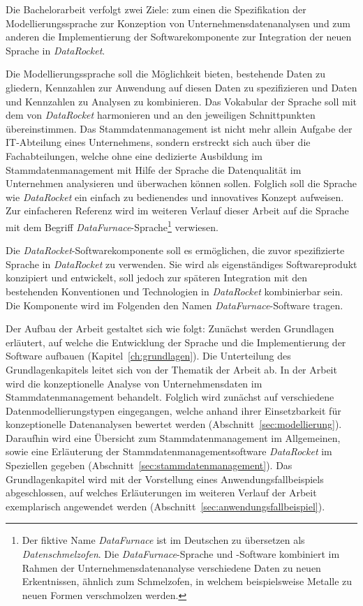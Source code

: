 \documentclass[
  language=german, %
  type=bachelor,%
  ngerman
]{isthesis}
\begin{document}
\begin{content}
  Die Bachelorarbeit verfolgt zwei Ziele: zum einen die Spezifikation der
  Modellierungssprache zur Konzeption von Unternehmensdatenanalysen und zum
  anderen die Implementierung der Softwarekomponente zur Integration der neuen
  Sprache in \textit{DataRocket}.

  Die Modellierungssprache soll die Möglichkeit bieten, bestehende Daten zu
  gliedern, Kennzahlen zur Anwendung auf diesen Daten zu spezifizieren und
  Daten und Kennzahlen zu Analysen zu kombinieren. Das Vokabular der Sprache
  soll mit dem von \textit{DataRocket} harmonieren und an den jeweiligen
  Schnittpunkten übereinstimmen.  Das Stammdatenmanagement ist nicht mehr
  allein Aufgabe der IT-Abteilung eines Unternehmens, sondern
  erstreckt sich auch über die Fachabteilungen, welche ohne eine dedizierte
  Ausbildung im Stammdatenmanagement mit Hilfe der Sprache die Datenqualität im
  Unternehmen analysieren und überwachen können sollen. Folglich soll die
  Sprache wie \textit{DataRocket} ein einfach zu bedienendes und innovatives
  Konzept aufweisen. Zur einfacheren Referenz wird im weiteren Verlauf dieser
  Arbeit auf die Sprache mit dem Begriff
  \textit{DataFurnace}-Sprache\footnote{Der fiktive Name \textit{DataFurnace}
  ist im Deutschen zu übersetzen als \textit{Datenschmelzofen}. Die
  \textit{DataFurnace}-Sprache und -Software kombiniert im Rahmen der
  Unternehmensdatenanalyse verschiedene Daten zu neuen Erkentnissen, ähnlich
  zum Schmelzofen, in welchem beispielsweise Metalle zu neuen Formen
  verschmolzen werden.}  verwiesen.

  Die \textit{DataRocket}-Softwarekomponente soll es ermöglichen, die zuvor
  spezifizierte Sprache in \textit{DataRocket} zu verwenden. Sie wird als
  eigenständiges Softwareprodukt konzipiert und entwickelt, soll jedoch zur
  späteren Integration mit den bestehenden Konventionen und Technologien in
  \textit{DataRocket} kombinierbar sein. Die Komponente wird im Folgenden den
  Namen \textit{DataFurnace}-Software  tragen.

   Der Aufbau der Arbeit gestaltet sich wie folgt: Zunächst werden Grundlagen
   erläutert, auf welche die Entwicklung der Sprache und die Implementierung
   der Software aufbauen (Kapitel~\ref{ch:grundlagen}). Die Unterteilung des
   Grundlagenkapitels leitet sich von der Thematik der Arbeit ab. In der Arbeit
   wird die konzeptionelle Analyse von Unternehmensdaten im
   Stammdatenmanagement behandelt. Folglich wird zunächst auf verschiedene
   Datenmodellierungstypen eingegangen, welche anhand ihrer Einsetzbarkeit für
   konzeptionelle Datenanalysen bewertet werden
   (Abschnitt~\ref{sec:modellierung}). Daraufhin wird eine Übersicht zum
   Stammdatenmanagement im Allgemeinen, sowie eine Erläuterung der
   Stammdatenmanagementsoftware \textit{DataRocket} im Speziellen gegeben
   (Abschnitt~\ref{sec:stammdatenmanagement}). Das Grundlagenkapitel wird mit
   der Vorstellung eines Anwendungsfallbeispiels abgeschlossen, auf welches
   Erläuterungen im weiteren Verlauf der Arbeit exemplarisch angewendet werden
   (Abschnitt~\ref{sec:anwendungsfallbeispiel}).


\end{content}
\end{document}
